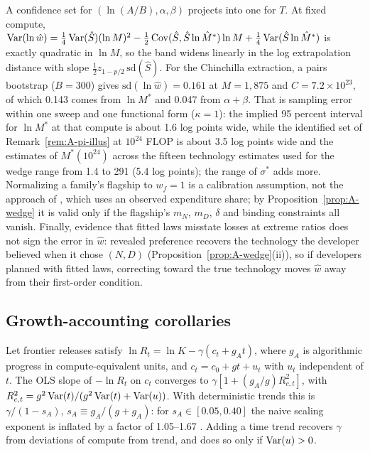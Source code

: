 \begin{remark}\label{rem:A-pi-param}
A confidence set for $(\ln(A/B),\alpha,\beta)$ projects into one for $T$. At fixed compute,
$\operatorname{Var}(\ln\hat w)=\tfrac14\operatorname{Var}(\hat S)(\ln M)^2-\tfrac12\operatorname{Cov}(\hat S,\hat S\ln\hat M^*)\ln M+\tfrac14\operatorname{Var}(\hat S\ln\hat M^*)$ is
exactly quadratic in $\ln M$, so the band widens linearly in the log extrapolation distance with slope
$\tfrac12z_{1-p/2}\,\mathrm{sd}(\hat S)$. For the Chinchilla extraction, a pairs bootstrap ($B=300$) gives
$\mathrm{sd}(\ln\hat w)=0.161$ at $M=1{,}875$ and $C=7.2\times10^{23}$, of which 0.143 comes from $\ln M^*$ and 0.047 from
$\alpha+\beta$. That is sampling error within one sweep and one functional form ($\kappa=1$): the implied 95 percent
interval for $\ln M^*$ at that compute is about 1.6 log points wide, while the identified set of
Remark~\ref{rem:A-pi-illus} at $10^{24}$ FLOP is about 3.5 log points wide and the estimates of $M^*(10^{24})$ across the
fifteen technology estimates used for the wedge range from 1.4 to 291 (5.4 log points); the range of $\sigma^*$ adds more. Normalizing a family's flagship to $w_f=1$ is a calibration assumption, not the approach of
\citet{gandhi2020identification}, which uses an observed expenditure share; by Proposition~\ref{prop:A-wedge} it is valid
only if the flagship's $m_N$, $m_D$, $\delta$ and binding constraints all vanish. Finally, evidence that fitted laws
misstate losses at extreme ratios \citep{sardana2024beyond} does not sign the error in $\hat w$: revealed preference recovers
the technology the developer believed when it chose $(N,D)$ (Proposition~\ref{prop:A-wedge}(ii)), so if developers planned
with fitted laws, correcting toward the true technology moves $\hat w$ away from their first-order condition.
\end{remark}

\subsection{Growth-accounting corollaries}\label{app:growth}

\begin{corollary}\label{cor:sahal}
Let frontier releases satisfy $\ln R_t=\ln K-\gamma(c_t+g_At)$, where $g_A$ is algorithmic progress in compute-equivalent
units, and $c_t=c_0+gt+u_t$ with $u_t$ independent of $t$. The OLS slope of $-\ln R_t$ on $c_t$ converges to
$\gamma[1+(g_A/g)R^2_{c,t}]$, with $R^2_{c,t}=g^2\operatorname{Var}(t)/(g^2\operatorname{Var}(t)+\operatorname{Var}(u))$. With deterministic trends this is
$\gamma/(1-s_A)$, $s_A\equiv g_A/(g+g_A)$: for $s_A\in[0.05,0.40]$ the naive scaling exponent is inflated by a factor of
1.05--1.67 \citep{nagy2013statistical}. Adding a time trend recovers $\gamma$ from deviations of compute from trend, and
does so only if $\operatorname{Var}(u)>0$.
\end{corollary}

